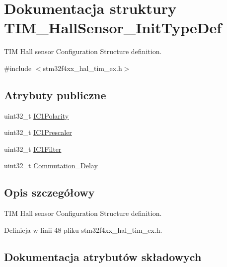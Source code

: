 \hypertarget{struct_t_i_m___hall_sensor___init_type_def}{}\section{Dokumentacja struktury T\+I\+M\+\_\+\+Hall\+Sensor\+\_\+\+Init\+Type\+Def}
\label{struct_t_i_m___hall_sensor___init_type_def}


T\+IM Hall sensor Configuration Structure definition.  




{\ttfamily \#include $<$stm32f4xx\+\_\+hal\+\_\+tim\+\_\+ex.\+h$>$}

\subsection*{Atrybuty publiczne}
\begin{DoxyCompactItemize}
\item 
uint32\+\_\+t \hyperlink{struct_t_i_m___hall_sensor___init_type_def_a08e8f098cb51159344135bab57d82d85}{I\+C1\+Polarity}
\item 
uint32\+\_\+t \hyperlink{struct_t_i_m___hall_sensor___init_type_def_ac6c54e891cbe5afec92676219978209e}{I\+C1\+Prescaler}
\item 
uint32\+\_\+t \hyperlink{struct_t_i_m___hall_sensor___init_type_def_a2d349ca17282be59dd09dc9b10948d24}{I\+C1\+Filter}
\item 
uint32\+\_\+t \hyperlink{struct_t_i_m___hall_sensor___init_type_def_a822efefca8a13af284e84070bd19bb91}{Commutation\+\_\+\+Delay}
\end{DoxyCompactItemize}


\subsection{Opis szczegółowy}
T\+IM Hall sensor Configuration Structure definition. 

Definicja w linii 48 pliku stm32f4xx\+\_\+hal\+\_\+tim\+\_\+ex.\+h.



\subsection{Dokumentacja atrybutów składowych}
\mbox{\label{struct_t_i_m___hall_sensor___init_type_def_a822efefca8a13af284e84070bd19bb91}} 
